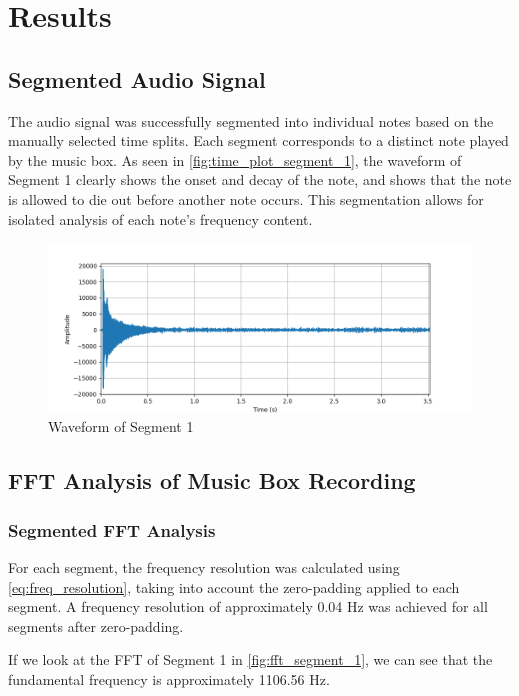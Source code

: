 \chapter{Results}

\section{Segmented Audio Signal}

The audio signal was successfully segmented into individual notes based on the manually selected time splits. Each segment corresponds to a distinct note played by the music box. As seen in \autoref{fig:time_plot_segment_1}, the waveform of Segment 1 clearly shows the onset and decay of the note, and shows that the note is allowed to die out before another note occurs. This segmentation allows for isolated analysis of each note's frequency content.

\begin{figure}[H]
    \centering
    \includegraphics[width=\textwidth]{data/time_plots/time_plot_segment_1.png}
    \caption{Waveform of Segment 1}
    \label{fig:time_plot_segment_1}
\end{figure}


\section{FFT Analysis of Music Box Recording}

\subsection{Segmented FFT Analysis}

For each segment, the frequency resolution was calculated using \autoref{eq:freq_resolution}, taking into account the zero-padding applied to each segment. A frequency resolution of approximately 0.04 Hz was achieved for all segments after zero-padding. 

If we look at the FFT of Segment 1 in \autoref{fig:fft_segment_1}, we can see that the fundamental frequency is approximately 1106.56 Hz. 

